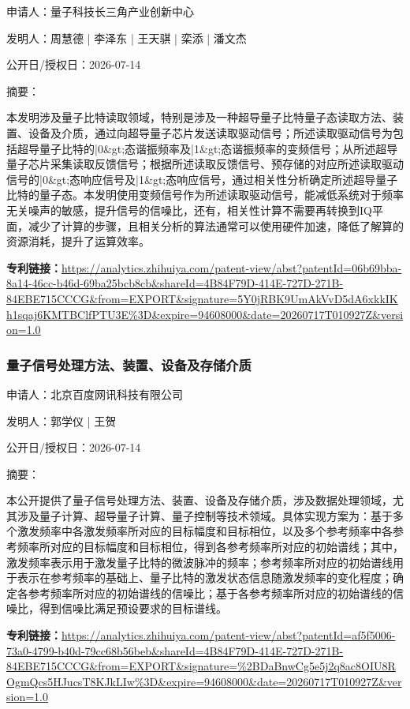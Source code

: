 \documentclass[12pt,a4paper]{ctexart}
\begin{document}
申请人：量子科技长三角产业创新中心

发明人：周慧德 | 李泽东 | 王天骐 | 栾添 | 潘文杰

公开日/授权日：2026-07-14

摘要：

本发明涉及量子比特读取领域，特别是涉及一种超导量子比特量子态读取方法、装置、设备及介质，通过向超导量子芯片发送读取驱动信号；所述读取驱动信号为包括超导量子比特的|0\&gt;态谐振频率及|1\&gt;态谐振频率的变频信号；从所述超导量子芯片采集读取反馈信号；根据所述读取反馈信号、预存储的对应所述读取驱动信号的|0\&gt;态响应信号及|1\&gt;态响应信号，通过相关性分析确定所述超导量子比特的量子态。本发明使用变频信号作为所述读取驱动信号，能减低系统对于频率无关噪声的敏感，提升信号的信噪比，还有，相关性计算不需要再转换到IQ平面，减少了计算的步骤，且相关分析的算法通常可以使用硬件加速，降低了解算的资源消耗，提升了运算效率。

\noindent\textbf{专利链接：}\url{https://analytics.zhihuiya.com/patent-view/abst?patentId=06b69bba-8a14-46cc-b46d-69ba25bcb8cb&shareId=4B84F79D-414E-727D-271B-84EBE715CCCG&from=EXPORT&signature=5Y0jRBK9UmAkVvD5dA6xkkIKh1sqaj6KMTBClfPTU3E%3D&expire=94608000&date=20260717T010927Z&version=1.0}

\subsubsection{ 量子信号处理方法、装置、设备及存储介质 }

申请人：北京百度网讯科技有限公司

发明人：郭学仪 | 王贺

公开日/授权日：2026-07-14

摘要：

本公开提供了量子信号处理方法、装置、设备及存储介质，涉及数据处理领域，尤其涉及量子计算、超导量子计算、量子控制等技术领域。具体实现方案为：基于多个激发频率中各激发频率所对应的目标幅度和目标相位，以及多个参考频率中各参考频率所对应的目标幅度和目标相位，得到各参考频率所对应的初始谱线；其中，激发频率表示用于激发量子比特的微波脉冲的频率；参考频率所对应的初始谱线用于表示在参考频率的基础上、量子比特的激发状态信息随激发频率的变化程度；确定各参考频率所对应的初始谱线的信噪比；基于各参考频率所对应的初始谱线的信噪比，得到信噪比满足预设要求的目标谱线。

\noindent\textbf{专利链接：}\url{https://analytics.zhihuiya.com/patent-view/abst?patentId=af5f5006-73a0-4799-b40d-79cc68b56beb&shareId=4B84F79D-414E-727D-271B-84EBE715CCCG&from=EXPORT&signature=%2BDaBnwCg5e5j2q8ac8OIU8ROgmQcs5HJucsT8KJkLIw%3D&expire=94608000&date=20260717T010927Z&version=1.0}
\end{document}
